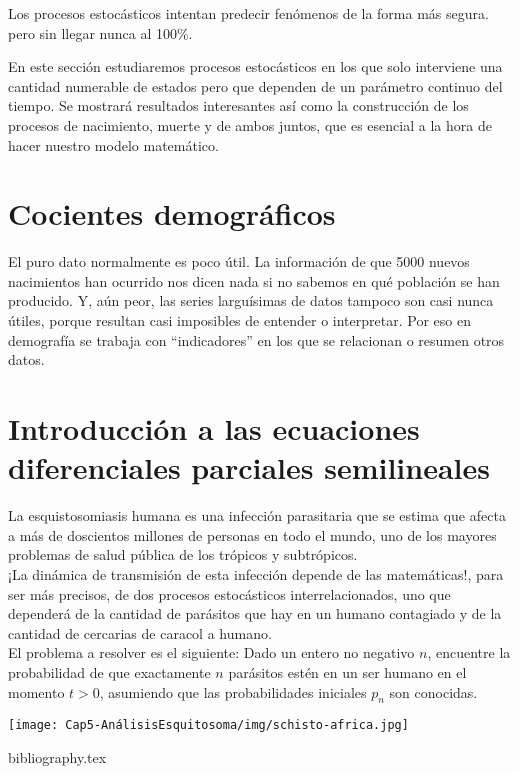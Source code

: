 \documentclass[a4paper,11pt]{book}
\begin{document}
    Los procesos estocásticos intentan predecir fenómenos de la forma más segura. pero sin llegar nunca al 100\%.
    
    En este sección estudiaremos procesos estocásticos en los que solo interviene una cantidad numerable de estados pero que dependen de un parámetro continuo del tiempo. Se mostrará resultados interesantes así como la construcción de los procesos de nacimiento, muerte y de ambos juntos, que es esencial a la hora de hacer nuestro modelo matemático.
    
    
    
    
    
\chapter{Cocientes demográficos}
    El puro dato normalmente es poco útil. La información de que 5000 nuevos nacimientos han ocurrido nos dicen nada si no sabemos en qué población se han producido. Y, aún peor, las series larguísimas de datos tampoco son casi nunca útiles, porque resultan casi imposibles de entender o interpretar. Por eso en demografía se trabaja con “indicadores” en los que se relacionan o resumen otros datos.
    
    

\chapter{Introducción a las ecuaciones diferenciales parciales semilineales}
La esquistosomiasis humana es una infección parasitaria que se estima que afecta a m\'as de doscientos millones de personas en todo el mundo, uno de los mayores problemas de salud pública de los trópicos y subtrópicos.\\
¡La dinámica de transmisión de esta infección depende de las matemáticas!, para ser más precisos, de dos procesos estocásticos interrelacionados, uno que dependerá de la cantidad de parásitos que hay en un humano contagiado y de la cantidad de cercarias de caracol a humano.\\
El problema a resolver es el siguiente:
Dado un entero no negativo $n$, encuentre la probabilidad de que exactamente $n$ parásitos estén en un ser humano en el momento $t>0$, asumiendo que las probabilidades iniciales $p_n$ son conocidas.
\begin{center}
\texttt{[image: Cap5-AnálisisEsquitosoma/img/schisto-africa.jpg]}
\end{center}
    
    
    
    
    

\backmatter

{bibliography.tex}
\end{document}
